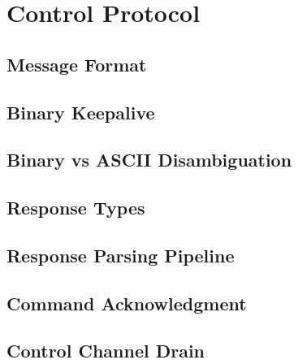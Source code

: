 \documentclass[11pt,letterpaper]{article}
\begin{document}
\newpage
\section{Control Protocol}
\label{sec:control-protocol}

\subsection{Message Format}
\label{subsec:message-format}


\subsection{Binary Keepalive}
\label{subsec:keepalive}


\subsection{Binary vs ASCII Disambiguation}
\label{subsec:binary-ascii}


\subsection{Response Types}
\label{subsec:response-types}


\subsection{Response Parsing Pipeline}
\label{subsec:response-parsing}


\subsection{Command Acknowledgment}
\label{subsec:command-ack}


\subsection{Control Channel Drain}
\label{subsec:drain-control}
\end{document}
